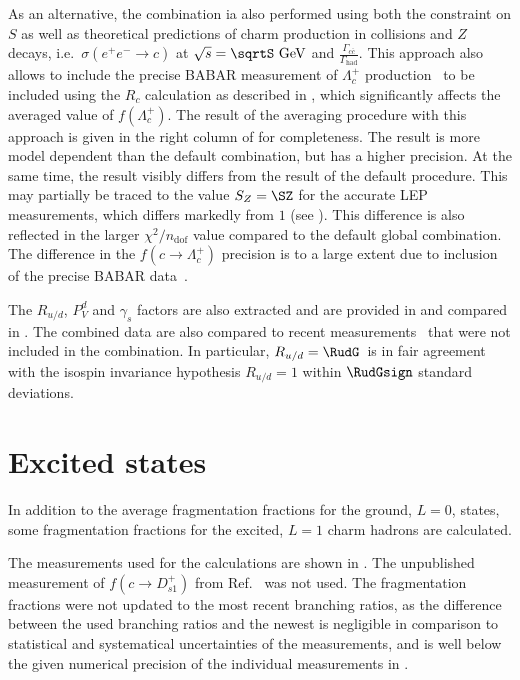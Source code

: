\figFINALaverageFF
\tabFINALaverage
\tabFINALcorrelations

As an alternative, the combination ia also performed using both the 
constraint on $S$ as well as theoretical predictions of charm 
production
in \epem collisions and $Z$ decays, i.e.\  $\sigma(e^+e^-\rightarrow c)$
at $\sqrt{s}=\sqrtS~\GeV$
and $\frac{\Gamma_{c\bar c}}{\Gamma_{\text{had}}}$. 
%
This approach also allows to include the precise BABAR 
measurement of $\Lambda_{c}^{+}$ production~\cite{Aubert:2006cp} to 
be included using the $R_c$ calculation as described in , 
which significantly affects the averaged value of $f(\Lambda_c^+)$.
%
The result of the averaging procedure with this approach
 is given in the right column of  for completeness.
The result is more model dependent than the default 
combination, but has a higher precision. At the same time, the result 
visibly differs from the result of the default procedure.
%
This may partially be
traced to the value $S_{Z} = \SZ$ for the accurate LEP
measurements, which differs markedly from $1$ (see ).
%
This difference is also reflected in the larger $\chi^2 /n_{\text{dof}}$
value compared to the default global combination.
%
The difference in the $f(c \rightarrow \Lambda_{c}^{+})$ precision is to
a large extent due to inclusion of the precise BABAR 
 data~\cite{Aubert:2006cp}.

\figFINALaverageRPg
The $R_{u/d}$, $P^d_{V}$ and $\gamma_{s}$ factors are also extracted 
and are provided in  and compared in 
.
%
The combined data are also compared to recent 
measurements~\cite{ATLAS:2011fea,ALICE:2011aa,
Abelev:2012vra, Abelev:2012tca, Acosta:2003ax, David:2007iv}
that were not included in the combination.
%
In particular, $R_{u/d} = \RudG\,$ is in fair agreement with the isospin 
invariance hypothesis $R_{u/d} = 1$ within $\RudGsign$ standard 
deviations.
%
\FloatBarrier
\section{Excited states}  
In addition to the average fragmentation fractions for the ground, 
$L=0$, states, some fragmentation fractions for the excited, 
$L=1$ charm hadrons are calculated.

The  measurements used for the calculations are shown in  .
The unpublished measurement of $f(c\rightarrow D^+_{s1})$ from 
Ref.~\cite{Verbytskyi:2013jsa} was not used.
The fragmentation fractions were not updated to the most recent 
branching ratios, as the difference between the used branching ratios 
and the newest is  negligible in comparison to statistical and 
systematical  uncertainties of the measurements, and is well below the 
given numerical precision of the individual measurements in 
.

